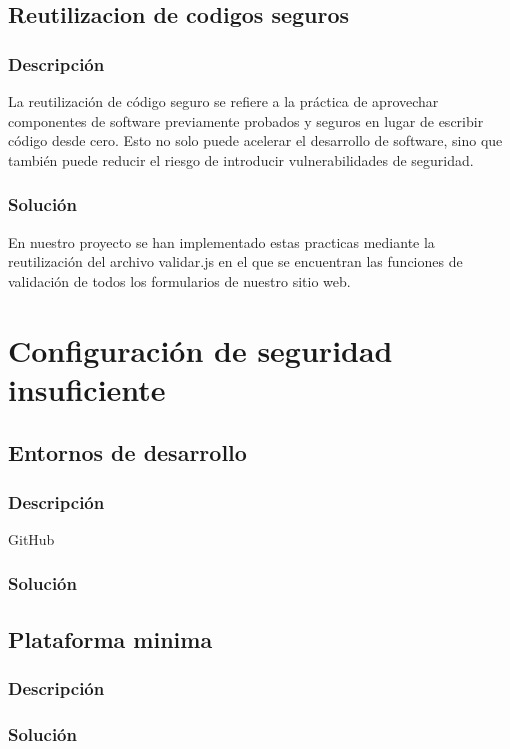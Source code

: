 \documentclass{report}
\begin{document}
            \subsection{Reutilizacion de codigos seguros}
                \subsubsection{Descripción}
                    La reutilización de código seguro se refiere a la práctica de aprovechar componentes de software previamente probados y seguros en lugar de escribir código desde cero. Esto no solo puede acelerar el desarrollo de software, sino que también puede reducir el riesgo de introducir vulnerabilidades de seguridad.
                \subsubsection{Solución}
                    En nuestro proyecto se han implementado estas practicas mediante la reutilización del archivo validar.js en el que se encuentran las funciones de validación de todos los formularios de nuestro sitio web.
            \clearpage
        \section{Configuración de seguridad insuficiente}
            \subsection{Entornos de desarrollo}
                \subsubsection{Descripción}
                    GitHub
                \subsubsection{Solución}
            \clearpage
            \subsection{Plataforma minima}
                \subsubsection{Descripción}
                \subsubsection{Solución}
            \clearpage
\end{document}
